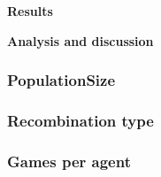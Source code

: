 \textbf{Results}


\textbf{Analysis and discussion}


\subsubsection{PopulationSize}


\subsubsection{Recombination type}



\subsubsection{Games per agent}









